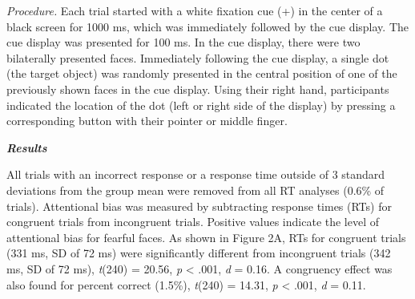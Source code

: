 \documentclass{article}
\begin{document}
\emph{Procedure. }Each trial started with a white fixation cue (+) in the center of a black screen for 1000 ms, which was immediately followed by the cue display. The cue display was presented for 100 ms. In the cue display, there were two bilaterally presented faces. Immediately following the cue display, a single dot (the target object) was randomly presented in the central position of one of the previously shown faces in the cue display. Using their right hand, participants indicated the location of the dot (left or right side of the display) by pressing a corresponding button with their pointer or middle finger.

\emph{\textbf{Results}}

All trials with an incorrect response or a response time outside of 3 standard deviations from the group mean were removed from all RT analyses (0.6\% of trials). Attentional bias was measured by subtracting response times (RTs) for congruent trials from incongruent trials. Positive values indicate the level of attentional bias for fearful faces. As shown in Figure 2A, RTs for congruent trials (331 ms, SD of 72 ms) were significantly different from incongruent trials (342 ms, SD of 72 ms), \emph{t}(240) = 20.56, \emph{p} < .001, \emph{d }= 0.16. A congruency effect was also found for percent correct (1.5\%), \emph{t}(240) = 14.31, \emph{p} < .001, \emph{d }= 0.11.
\end{document}
